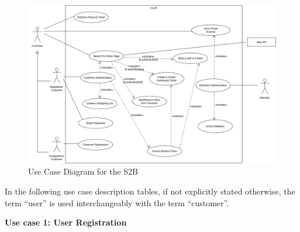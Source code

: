 \begin{figure}[H]
    \includegraphics[width=\textwidth]{Images/UML_use_case_diagram.png}
    \caption{\label{fig:Use_Case_Diag}Use Case Diagram for the S2B}
\end{figure}


\medskip
\clearpage
In the following use case description tables, if not explicitly stated otherwise, the term ``user'' is used interchangeably with the term ``customer''.
\medskip

\textbf{Use case 1: User Registration}
\smallskip

